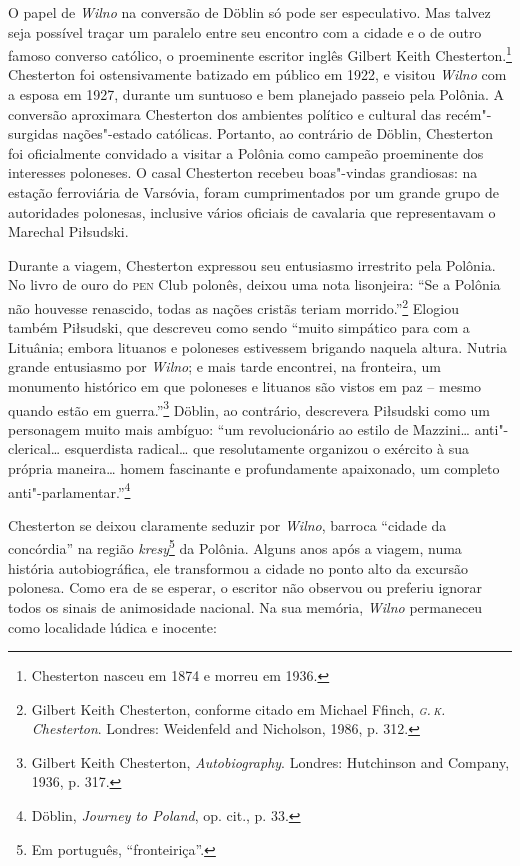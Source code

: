 O papel de \textit{Wilno} na conversão de Döblin só pode ser especulativo. Mas
talvez seja possível traçar um paralelo entre seu encontro com a cidade
e o de outro famoso converso católico, o proeminente escritor inglês
Gilbert Keith Chesterton.\footnote{Chesterton nasceu em 1874 e morreu em 1936.} Chesterton foi ostensivamente
batizado em público em 1922, e visitou \textit{Wilno} com a esposa em 1927,
durante um suntuoso e bem planejado passeio pela Polônia. A conversão
aproximara Chesterton dos ambientes político e cultural das
recém"-surgidas nações"-estado católicas. Portanto, ao contrário de
Döblin, Chesterton foi oficialmente convidado a visitar a Polônia como
campeão proeminente dos interesses poloneses. O casal Chesterton recebeu
boas"-vindas grandiosas: na estação ferroviária de Varsóvia, foram
cumprimentados por um grande grupo de autoridades polonesas, inclusive
vários oficiais de cavalaria que representavam o Marechal Piłsudski.

Durante a viagem, Chesterton expressou seu entusiasmo irrestrito pela
Polônia. No livro de ouro do \textsc{pen} Club polonês, deixou uma nota
lisonjeira: ``Se a Polônia não houvesse renascido, todas as nações
cristãs teriam morrido.''\footnote{Gilbert Keith Chesterton, conforme citado em Michael Ffinch, \textit{\textsc{g.\,k.}\,Chesterton}. Londres: Weidenfeld and Nicholson, 1986, p. 312.} Elogiou também Piłsudski, que descreveu como sendo ``muito simpático para com a Lituânia; embora lituanos e
poloneses estivessem brigando naquela altura. Nutria grande entusiasmo
por \textit{Wilno}; e mais tarde encontrei, na fronteira, um monumento histórico
em que poloneses e lituanos são vistos em paz -- mesmo quando estão em
guerra.''\footnote{Gilbert Keith Chesterton, \textit{Autobiography}. Londres: Hutchinson and Company, 1936, p. 317.} Döblin, ao contrário, descrevera Piłsudski como um personagem muito mais ambíguo: ``um
revolucionário ao estilo de Mazzini\ldots{} anti"-clerical\ldots{}
esquerdista radical\ldots{} que resolutamente organizou o exército
à sua própria maneira\ldots{} homem fascinante e profundamente
apaixonado, um completo anti"-parlamentar.''\footnote{Döblin, \textit{Journey to Poland}, op. cit., p. 33.}

Chesterton se deixou claramente seduzir por \textit{Wilno}, barroca ``cidade da
concórdia'' na região \textit{kresy}\footnote{Em português, ``fronteiriça''.} da Polônia. Alguns anos
após a viagem, numa história autobiográfica, ele transformou a cidade no
ponto alto da excursão polonesa. Como era de se esperar, o escritor não
observou ou preferiu ignorar todos os sinais de animosidade nacional. Na
sua memória, \textit{Wilno} permaneceu como localidade lúdica e inocente:

